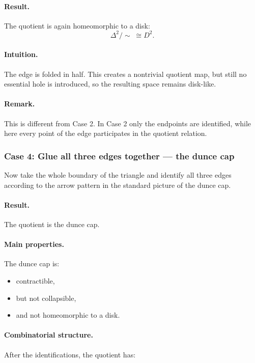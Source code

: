 \documentclass[12pt,a4paper]{article}
\theoremstyle{notespace}
\begin{document}
\paragraph{Result.}
The quotient is again homeomorphic to a disk:
\[
\Delta^2/\!\sim \;\cong D^2.
\]

\paragraph{Intuition.}
The edge is folded in half. This creates a nontrivial quotient map, but still no essential hole is introduced, so the resulting space remains disk-like.

\paragraph{Remark.}
This is different from Case 2. In Case 2 only the endpoints are identified, while here every point of the edge participates in the quotient relation.

\subsubsection{Case 4: Glue all three edges together --- the dunce cap}

Now take the whole boundary of the triangle and identify all three edges according to the arrow pattern in the standard picture of the dunce cap.

\paragraph{Result.}
The quotient is the dunce cap.

\paragraph{Main properties.}
The dunce cap is:

\begin{itemize}
	\item contractible,
	\item but not collapsible,
	\item and not homeomorphic to a disk.
\end{itemize}

\paragraph{Combinatorial structure.}
After the identifications, the quotient has:
\end{document}
